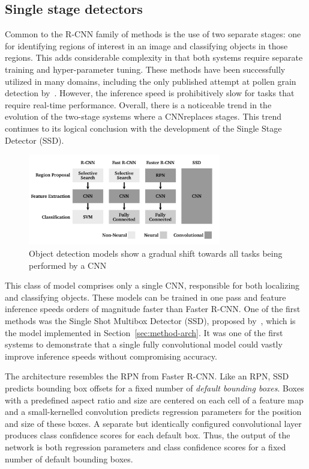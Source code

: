 \subsection{Single stage detectors}\label{sec:ssd}
Common to the R-CNN family of methods is the use of two separate stages: one for identifying regions of interest in an image and classifying objects in those regions.
This adds considerable complexity in that both systems require separate training and hyper-parameter tuning.
These methods have been successfully utilized in many domains, including the only published attempt at pollen grain detection by\ \cite{gallardo_caballero_precise_2019}.
However, the inference speed is prohibitively slow for tasks that require real-time performance.
Overall, there is a noticeable trend in the evolution of the two-stage systems where a CNN\@ replaces stages.
This trend continues to its logical conclusion with the development of the Single Stage Detector (SSD).

\begin{figure}[htbp]
  \centering
  \includegraphics[width=0.75\textwidth]{figs/related/detector_evolution.pdf}
  \caption[Evolution of object detection models]{Object detection models show a gradual shift towards all tasks being performed by a CNN}\label{fig:related-detectors}
\end{figure}

This class of model comprises only a single CNN, responsible for both localizing and classifying objects.
These models can be trained in one pass and feature inference speeds orders of magnitude faster than Faster R-CNN\@.
One of the first methods was the Single Shot Multibox Detector (SSD), proposed by\ \textcite{liu_ssd_2016}, which is the model implemented in Section~\ref{sec:method-arch}.
It was one of the first systems to demonstrate that a single fully convolutional model could vastly improve inference speeds without compromising accuracy.

The architecture resembles the RPN from Faster R-CNN\@.
Like an RPN, SSD predicts bounding box offsets for a fixed number of \textit{default bounding boxes}.
Boxes with a predefined aspect ratio and size are centered on each cell of a feature map and a small-kernelled convolution predicts regression parameters for the position and size of these boxes.
A separate but identically configured convolutional layer produces class confidence scores for each default box.
Thus, the output of the network is both regression parameters and class confidence scores for a fixed number of default bounding boxes.

